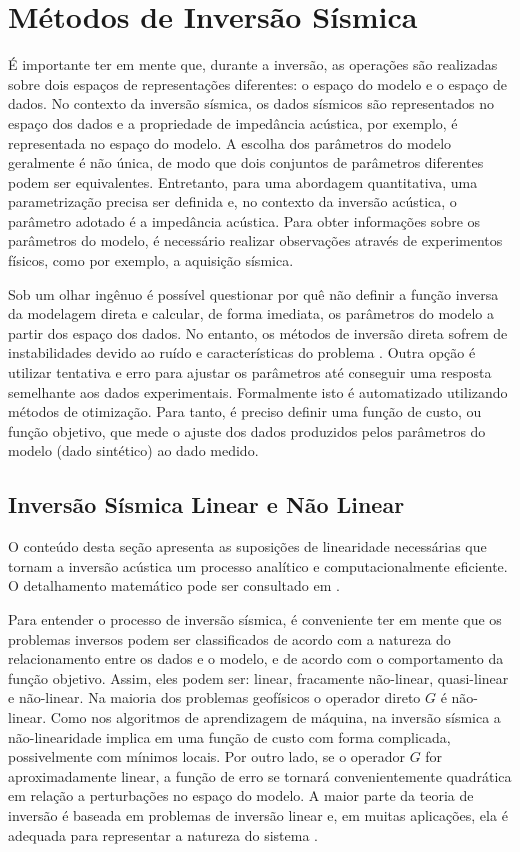 \section{Métodos de Inversão Sísmica}
É importante ter em mente que, durante a inversão, as operações são realizadas
sobre dois espaços de representações diferentes: o espaço do modelo e o espaço de dados.
No contexto da inversão sísmica, os dados sísmicos são representados no espaço
dos dados e a propriedade de impedância acústica, por exemplo, é representada
no espaço do modelo.
A escolha dos parâmetros do modelo geralmente é não única, de modo que dois conjuntos
de parâmetros diferentes podem ser equivalentes.
Entretanto, para uma abordagem quantitativa, uma parametrização precisa ser definida \cite{tarantola} e,
no contexto da inversão acústica, o parâmetro adotado é a impedância acústica.
Para obter informações sobre os parâmetros do modelo, é necessário
realizar observações através de experimentos físicos, como por exemplo, a
aquisição sísmica.

Sob um olhar ingênuo é possível questionar por quê não definir a
função inversa da modelagem direta e calcular, de forma imediata,
os parâmetros do modelo a partir dos espaço dos dados.
No entanto, os métodos de inversão direta sofrem de instabilidades
devido ao ruído e características do problema \citep[p. 50]{sen_livro}. Outra
opção é utilizar tentativa e erro para ajustar os parâmetros até conseguir uma
resposta semelhante aos dados experimentais. Formalmente isto é automatizado
utilizando métodos de otimização. Para tanto, é preciso definir uma função de
custo, ou função objetivo, que mede o ajuste dos dados produzidos pelos
parâmetros do modelo (dado sintético) ao dado medido.

\subsection{Inversão Sísmica Linear e Não Linear}
O conteúdo desta seção apresenta as suposições de linearidade necessárias
que tornam a inversão acústica um processo analítico e computacionalmente
eficiente. O detalhamento matemático pode ser consultado em \cite{Figueiredo2014,Figueiredo17}.

Para entender o processo de inversão sísmica, é conveniente ter em mente
que os problemas inversos podem ser classificados de acordo com a natureza
do relacionamento entre os dados e o modelo, e de acordo com o comportamento da função objetivo.
Assim, eles podem ser: linear, fracamente não-linear, quasi-linear e não-linear.
Na maioria dos problemas geofísicos o operador direto $G$ é não-linear.
Como nos algoritmos de aprendizagem de máquina, na inversão sísmica
a não-linearidade implica em uma função de custo com forma complicada,
possivelmente com mínimos locais.
Por outro lado, se o operador $G$ for aproximadamente linear, a
função de erro se tornará convenientemente quadrática em relação a perturbações
no espaço do modelo. A maior parte da teoria de inversão é baseada em problemas
de inversão linear e, em muitas aplicações, ela é 
adequada para representar a natureza do sistema \cite{sen_livro}.

